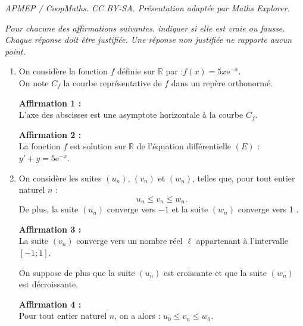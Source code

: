 \documentclass[10pt]{article}
\providecommand{\R}{\mathbb{R}}
\providecommand{\e}{{\mathrm{e}}}
\begin{document}
\noindent\textit{APMEP / CoopMaths. CC BY-SA. Présentation adaptée par Maths Explorer.}\par\medskip
\medskip
\emph{Pour chacune des affirmations suivantes, indiquer si elle est vraie ou fausse. Chaque réponse doit être justifiée. Une réponse non justifiée ne rapporte aucun point.
}
\begin{enumerate}
	\item On considère la fonction $f$ définie sur $\R$ par :\quad $f(x)=5 x \e^{-x}$.\\
	On note $C_{f}$ la courbe représentative de $f$ dans un repère orthonormé.

	\smallskip

	\textbf{Affirmation 1 :}\\
	L'axe des abscisses est une asymptote horizontale à la courbe $C_{f}$.

	\smallskip

	\textbf{Affirmation 2 :}\\
	La fonction $f$ est solution sur $\R$ de l'équation différentielle $(E)$ : $y'+y=5 \e^{-x}$.
	\smallskip

	\item On considère les suites $\left(u_{n}\right)$, $\left(v_{n}\right)$ et $\left(w_{n}\right)$, telles que, pour tout entier naturel $n$ :
	$$
	u_{n} \leqslant v_{n} \leqslant w_{n}.
	$$
	De plus, la suite $\left(u_{n}\right)$ converge vers $-1$ et la suite $\left(w_{n}\right)$ converge vers 1 .

	\smallskip
	\textbf{Affirmation 3 :}\\
	La suite $\left(v_{n}\right)$ converge vers un nombre réel $\ell$ appartenant à l'intervalle $[-1 ; 1]$.


	\smallskip
	On suppose de plus que la suite $\left(u_{n}\right)$ est croissante et que la suite $\left(w_{n}\right)$ est décroissante.

	\textbf{Affirmation 4 :}\\
	Pour tout entier naturel $n$, on a alors : \quad $u_{0} \leqslant v_{n} \leqslant w_{0}$.

\end{enumerate}

\medskip
\end{document}
